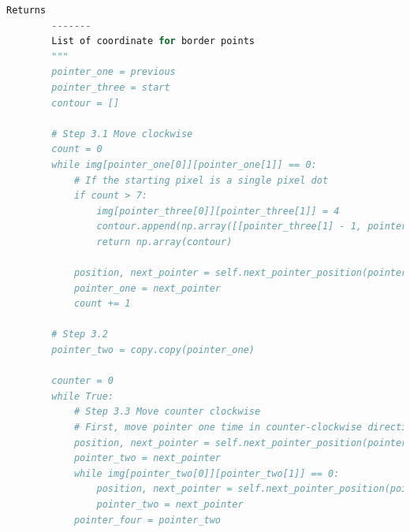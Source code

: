 \begin{lstlisting}[language=Python,basicstyle=\tiny]
        Returns
        -------
        List of coordinate for border points
        """
        pointer_one = previous
        pointer_three = start
        contour = []
        
        # Step 3.1 Move clockwise
        count = 0
        while img[pointer_one[0]][pointer_one[1]] == 0:
            # If the starting pixel is a single pixel dot
            if count > 7:
                img[pointer_three[0]][pointer_three[1]] = 4
                contour.append(np.array([[pointer_three[1] - 1, pointer_three[0] - 1]]))
                return np.array(contour)
                
            position, next_pointer = self.next_pointer_position(pointer_one, pointer_three, 1)
            pointer_one = next_pointer
            count += 1

        # Step 3.2
        pointer_two = copy.copy(pointer_one)

        counter = 0
        while True:
            # Step 3.3 Move counter clockwise
            # First, move pointer one time in counter-clockwise direction
            position, next_pointer = self.next_pointer_position(pointer_two, pointer_three, 2)
            pointer_two = next_pointer
            while img[pointer_two[0]][pointer_two[1]] == 0:
                position, next_pointer = self.next_pointer_position(pointer_two, pointer_three, 2)
                pointer_two = next_pointer
            pointer_four = pointer_two
\end{lstlisting}
